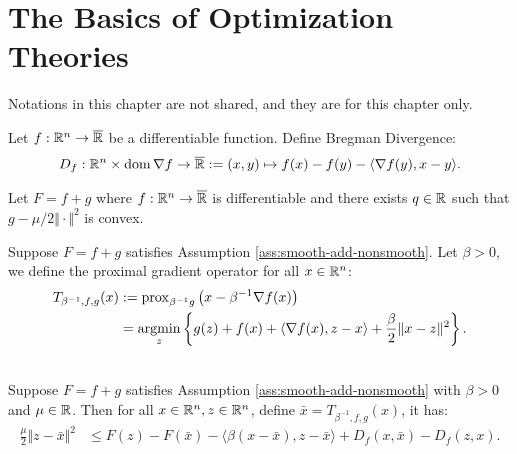 \documentclass[12pt]{report}
\begin{document}
\chapter{The Basics of Optimization Theories}
    Notations in this chapter are not shared, and they are for this chapter only. 
    \begin{definition}\label{def:bregman-div}
        Let $f:\mathbb R^n \rightarrow \overline {\mathbb R}$ be a differentiable function. 
        Define Bregman Divergence: 
        \begin{align*}
            D_f: \mathbb R^n \times \operatorname{dom} \nabla f \rightarrow \overline {\mathbb R}:= 
            (x, y) \mapsto f(x) - f(y) - \langle \nabla f(y), x - y\rangle. 
        \end{align*}
    \end{definition}
    \begin{assumption}\label{ass:smooth-add-nonsmooth}
        Let $F = f+ g$ where $f:\mathbb R^n \rightarrow \overline {\mathbb R}$ is differentiable and there exists $q\in \mathbb R$ such that $g - \mu/2\Vert \cdot\Vert^2$ is convex.
    \end{assumption}
    \begin{definition}
        Suppose $F = f + g$ satisfies Assumption \ref{ass:smooth-add-nonsmooth}. 
        Let $\beta > 0$, we define the proximal gradient operator for all $x \in \mathbb R^n$: 
        \begin{align*}
            T_{\beta^{-1}, f, g}(x) &:= \operatorname{prox}_{\beta^{-1}g} \left(
                x - \beta^{-1} \nabla f(x)
            \right)
            \\
            &= \mathop{\rm argmin}\limits_{z}\left\lbrace
                g(z) + f(x) + \langle \nabla f(x), z - x\rangle
                + \frac{\beta}{2}\Vert x - z\Vert^2
            \right\rbrace. 
        \end{align*}
    \end{definition}
    \begin{theorem}\;\label{thm:pg-ineq-wcnvx-generic}\\
        Suppose $F = f + g$ satisfies Assumption \ref{ass:smooth-add-nonsmooth} with $\beta > 0$ and $\mu \in \mathbb R$. 
        Then for all $x \in \mathbb R^n, z \in \mathbb R^n$, define $\bar x = T_{\beta^{-1}, f, g}(x)$, it has: 
        \begin{align*}
            \frac{\mu}{2}\Vert z - \bar x\Vert^2 
            &\le 
            F(z) - F(\bar x) - \langle \beta(x - \bar x), z - \bar x\rangle 
            + D_f(x, \bar x ) - D_f(z, x).  
        \end{align*}
    \end{theorem}
\end{document}
